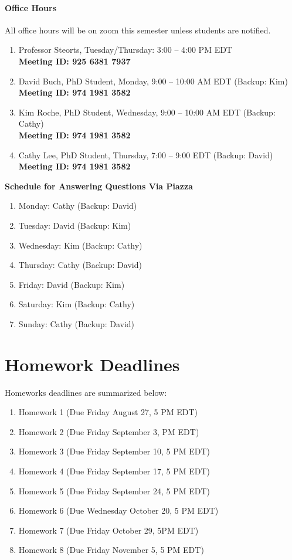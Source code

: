 \documentclass[11pt]{article}
\begin{document}
\paragraph{Office Hours}
All office hours will be on zoom this semester unless students are notified.
\begin{enumerate}
\item Professor Steorts, Tuesday/Thursday: 3:00 -- 4:00 PM EDT \\
\textbf{Meeting ID: 925 6381 7937}
\item David Buch, PhD Student, Monday, 9:00 -- 10:00 AM EDT  (Backup: Kim)\\
\textbf{Meeting ID: 974 1981 3582}
\item Kim Roche, PhD Student, Wednesday, 9:00 -- 10:00 AM EDT  (Backup: Cathy)\\
\textbf{Meeting ID: 974 1981 3582}
\item Cathy Lee, PhD Student, Thursday, 7:00 -- 9:00 EDT (Backup: David)\\
\textbf{Meeting ID: 974 1981 3582}
\end{enumerate}


\textbf{Schedule for Answering Questions Via Piazza}
\begin{enumerate}
\item Monday: Cathy (Backup: David)
\item Tuesday: David (Backup: Kim)
\item Wednesday: Kim (Backup: Cathy)
\item Thursday: Cathy (Backup: David)
\item Friday: David (Backup: Kim)
\item Saturday: Kim (Backup: Cathy)
\item Sunday: Cathy (Backup: David)
\end{enumerate}


\section{Homework Deadlines}
Homeworks deadlines are summarized below:

\begin{enumerate}
\item Homework 1 (Due Friday August 27, 5 PM EDT)
\item Homework 2 (Due Friday September 3, PM EDT)
\item Homework 3 (Due Friday September 10, 5 PM EDT)
\item Homework 4 (Due Friday September 17, 5 PM EDT)
\item Homework 5 (Due Friday September 24, 5 PM EDT)
\item Homework 6 (Due Wednesday October 20, 5 PM EDT)
\item Homework 7 (Due Friday October 29, 5PM EDT)
\item Homework 8 (Due Friday November 5, 5 PM EDT)
\end{enumerate} 
\end{document}
